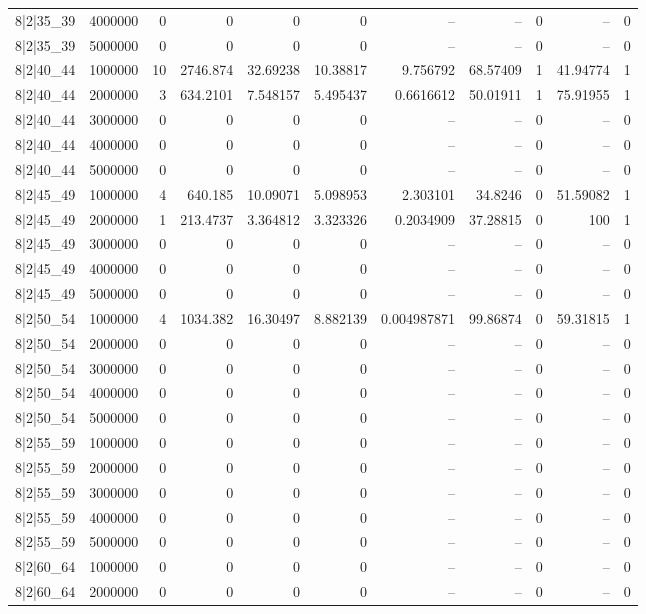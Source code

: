\begin{tabular}{lrrrrrrrrrr}
8|2|35\_39 & 4000000 & 0 & 0 & 0 & 0 & -- & -- & 0 & -- & 0 \\
8|2|35\_39 & 5000000 & 0 & 0 & 0 & 0 & -- & -- & 0 & -- & 0 \\
8|2|40\_44 & 1000000 & 10 & 2746.874 & 32.69238 & 10.38817 & 9.756792 & 68.57409 & 1 & 41.94774 & 1 \\
8|2|40\_44 & 2000000 & 3 & 634.2101 & 7.548157 & 5.495437 & 0.6616612 & 50.01911 & 1 & 75.91955 & 1 \\
8|2|40\_44 & 3000000 & 0 & 0 & 0 & 0 & -- & -- & 0 & -- & 0 \\
8|2|40\_44 & 4000000 & 0 & 0 & 0 & 0 & -- & -- & 0 & -- & 0 \\
8|2|40\_44 & 5000000 & 0 & 0 & 0 & 0 & -- & -- & 0 & -- & 0 \\
8|2|45\_49 & 1000000 & 4 & 640.185 & 10.09071 & 5.098953 & 2.303101 & 34.8246 & 0 & 51.59082 & 1 \\
8|2|45\_49 & 2000000 & 1 & 213.4737 & 3.364812 & 3.323326 & 0.2034909 & 37.28815 & 0 & 100 & 1 \\
8|2|45\_49 & 3000000 & 0 & 0 & 0 & 0 & -- & -- & 0 & -- & 0 \\
8|2|45\_49 & 4000000 & 0 & 0 & 0 & 0 & -- & -- & 0 & -- & 0 \\
8|2|45\_49 & 5000000 & 0 & 0 & 0 & 0 & -- & -- & 0 & -- & 0 \\
8|2|50\_54 & 1000000 & 4 & 1034.382 & 16.30497 & 8.882139 & 0.004987871 & 99.86874 & 0 & 59.31815 & 1 \\
8|2|50\_54 & 2000000 & 0 & 0 & 0 & 0 & -- & -- & 0 & -- & 0 \\
8|2|50\_54 & 3000000 & 0 & 0 & 0 & 0 & -- & -- & 0 & -- & 0 \\
8|2|50\_54 & 4000000 & 0 & 0 & 0 & 0 & -- & -- & 0 & -- & 0 \\
8|2|50\_54 & 5000000 & 0 & 0 & 0 & 0 & -- & -- & 0 & -- & 0 \\
8|2|55\_59 & 1000000 & 0 & 0 & 0 & 0 & -- & -- & 0 & -- & 0 \\
8|2|55\_59 & 2000000 & 0 & 0 & 0 & 0 & -- & -- & 0 & -- & 0 \\
8|2|55\_59 & 3000000 & 0 & 0 & 0 & 0 & -- & -- & 0 & -- & 0 \\
8|2|55\_59 & 4000000 & 0 & 0 & 0 & 0 & -- & -- & 0 & -- & 0 \\
8|2|55\_59 & 5000000 & 0 & 0 & 0 & 0 & -- & -- & 0 & -- & 0 \\
8|2|60\_64 & 1000000 & 0 & 0 & 0 & 0 & -- & -- & 0 & -- & 0 \\
8|2|60\_64 & 2000000 & 0 & 0 & 0 & 0 & -- & -- & 0 & -- & 0 \\

\end{tabular}
